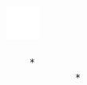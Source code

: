 \documentclass[10pt]{article}
\begin{document}
\includegraphics[max width=\textwidth, center]{2025_04_17_46e04c6acd873ea9558dg-142(14)}

\begin{verbatim}
    *
            *
\end{verbatim}
\end{document}
